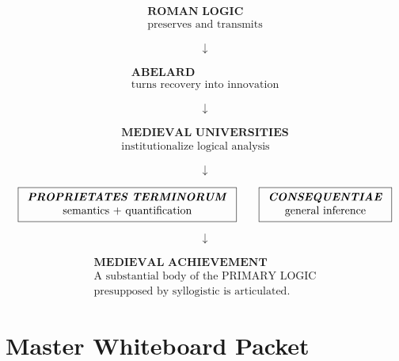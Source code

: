 \documentclass[11pt]{article}
\newcommand{\latin}[1]{\textit{#1}}
\begin{document}
\begin{whiteboard}
\[
\boxed{
\begin{array}{c}
\textbf{ROMAN LOGIC}\\
\text{preserves and transmits}
\end{array}
}
\]

\[
\downarrow
\]

\[
\boxed{
\begin{array}{c}
\textbf{ABELARD}\\
\text{turns recovery into innovation}
\end{array}
}
\]

\[
\downarrow
\]

\[
\boxed{
\begin{array}{c}
\textbf{MEDIEVAL UNIVERSITIES}\\
\text{institutionalize logical analysis}
\end{array}
}
\]

\[
\downarrow
\]

\[
\boxed{
\begin{array}{c}
\textbf{\latin{PROPRIETATES TERMINORUM}}\\
\text{semantics + quantification}
\end{array}
}
\qquad
\boxed{
\begin{array}{c}
\textbf{\latin{CONSEQUENTIAE}}\\
\text{general inference}
\end{array}
}
\]

\[
\downarrow
\]

\[
\boxed{
\begin{array}{c}
\textbf{MEDIEVAL ACHIEVEMENT}\\[0.3em]
\text{A substantial body of the PRIMARY LOGIC}\\
\text{presupposed by syllogistic is articulated.}
\end{array}
}
\]
\end{whiteboard}


\section*{Master Whiteboard Packet}
\end{document}
